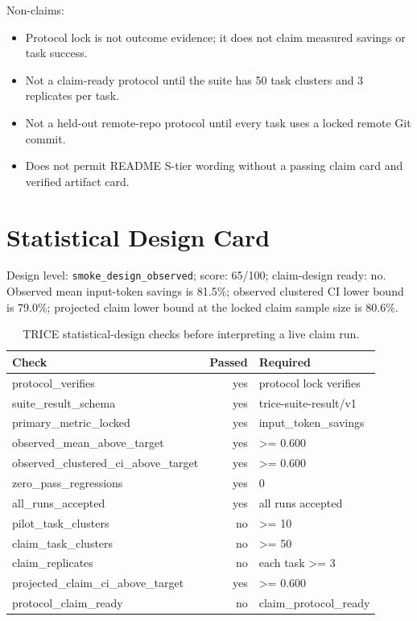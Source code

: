 \documentclass[10pt]{article}
\begin{document}
\noindent Non-claims:
\begin{itemize}
\item Protocol lock is not outcome evidence; it does not claim measured savings or task success.
\item Not a claim-ready protocol until the suite has 50 task clusters and 3 replicates per task.
\item Not a held-out remote-repo protocol until every task uses a locked remote Git commit.
\item Does not permit README S-tier wording without a passing claim card and verified artifact card.
\end{itemize}


        \section{Statistical Design Card}
Design level: \texttt{smoke\_design\_observed}; score: 65/100; claim-design ready: no. Observed mean input-token savings is 81.5\%; observed clustered CI lower bound is 79.0\%; projected claim lower bound at the locked claim sample size is 80.6\%.

\begin{table}[h]
\centering
\begin{tabular}{lrl}
\toprule
Check & Passed & Required \\
\midrule
protocol\_verifies & yes & protocol lock verifies \\
suite\_result\_schema & yes & trice-suite-result/v1 \\
primary\_metric\_locked & yes & input\_token\_savings \\
observed\_mean\_above\_target & yes & >= 0.600 \\
observed\_clustered\_ci\_above\_target & yes & >= 0.600 \\
zero\_pass\_regressions & yes & 0 \\
all\_runs\_accepted & yes & all runs accepted \\
pilot\_task\_clusters & no & >= 10 \\
claim\_task\_clusters & no & >= 50 \\
claim\_replicates & no & each task >= 3 \\
projected\_claim\_ci\_above\_target & yes & >= 0.600 \\
protocol\_claim\_ready & no & claim\_protocol\_ready \\
\bottomrule
\end{tabular}
\caption{TRICE statistical-design checks before interpreting a live claim run.}
\end{table}
\end{document}
